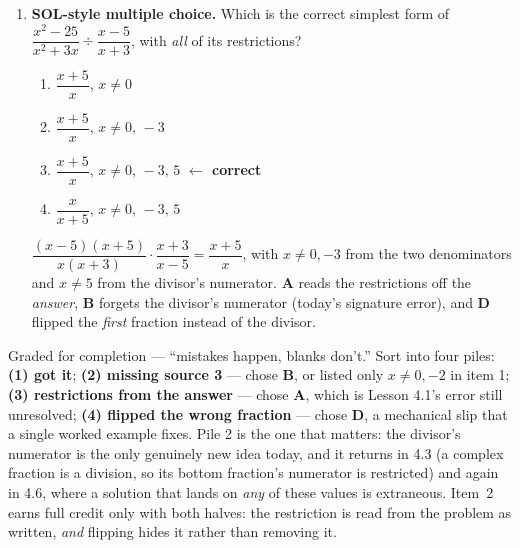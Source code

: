 \documentclass[10pt]{article}
\begin{document}
\begin{enumerate}[leftmargin=1.8em, itemsep=9pt]
  \item \textbf{SOL-style multiple choice.} Which is the correct simplest form of
        $\dfrac{x^2-25}{x^2+3x}\div\dfrac{x-5}{x+3}$, with \emph{all} of its restrictions?
        \begin{enumerate}[label=\Alph*., leftmargin=1.9em, itemsep=1pt]
          \item $\dfrac{x+5}{x}$, \; $x\neq0$
          \item $\dfrac{x+5}{x}$, \; $x\neq0,\,-3$
          \item $\dfrac{x+5}{x}$, \; $x\neq0,\,-3,\,5$
                \quad \textcolor{keyred}{\textbf{$\leftarrow$ correct}}
          \item $\dfrac{x}{x+5}$, \; $x\neq0,\,-3,\,5$
        \end{enumerate}
        \vspace{2pt}
        {\small $\dfrac{(x-5)(x+5)}{x(x+3)}\cdot\dfrac{x+3}{x-5}=\dfrac{x+5}{x}$, with $x\neq0,-3$ from
        the two denominators and $x\neq5$ from the divisor's numerator. \textbf{A} reads the
        restrictions off the \emph{answer}, \textbf{B} forgets the divisor's numerator (today's
        signature error), and \textbf{D} flipped the \emph{first} fraction instead of the divisor.}
\end{enumerate}

\begin{teachernote}
Graded for completion --- ``mistakes happen, blanks don't.'' Sort into four piles: \textbf{(1) got it};
\textbf{(2) missing source 3} --- chose \textbf{B}, or listed only $x\neq0,-2$ in item 1; \textbf{(3)
restrictions from the answer} --- chose \textbf{A}, which is Lesson 4.1's error still unresolved;
\textbf{(4) flipped the wrong fraction} --- chose \textbf{D}, a mechanical slip that a single worked
example fixes. Pile 2 is the one that matters: the divisor's numerator is the only genuinely new idea
today, and it returns in 4.3 (a complex fraction is a division, so its bottom fraction's numerator is
restricted) and again in 4.6, where a solution that lands on \emph{any} of these values is extraneous.
Item~2 earns full credit only with both halves: the restriction is read from the problem as written,
\emph{and} flipping hides it rather than removing it.
\end{teachernote}
\end{document}
